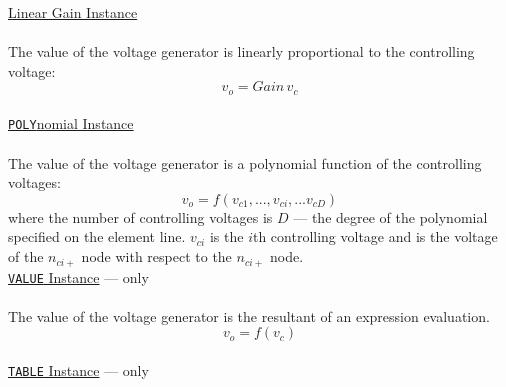 \noindent\underline{Linear Gain Instance}
\\[0.1in]\hspace*{\fill}\\[0.1in]
The value of the voltage generator is linearly proportional to the controlling
voltage:
\begin{equation}
v_o = Gain\,v_c
\end{equation}
\\[0.2in]\noindent\underline{{\tt POLY}nomial Instance}
\\[0.1in]\hspace*{\fill}\\[0.1in]
The value of the voltage generator is a polynomial function of the controlling
voltages:
\begin{equation}
v_o = f(v_{c1}, ...,  v_{ci}, ...  v_{cD})
\end{equation}
where the number of controlling voltages is $D$ --- the degree of the polynomial
specified on the element line.
$v_{ci}$ is the $i$th controlling voltage and is the voltage of the
$n_{ci+}$ node with respect to the $n_{ci+}$ node.
\\[0.2in]\noindent\underline{{\tt VALUE} Instance} ---  only
\\[0.1in]\hspace*{\fill}\\[0.1in]
The value of the voltage generator is the resultant of an expression evaluation.
\begin{equation}
v_o = f(v_c)
\end{equation}
\\[0.2in]\noindent\underline{{\tt TABLE} Instance} ---  only
\\[0.1in]\hspace*{\fill}\\[0.1in]
